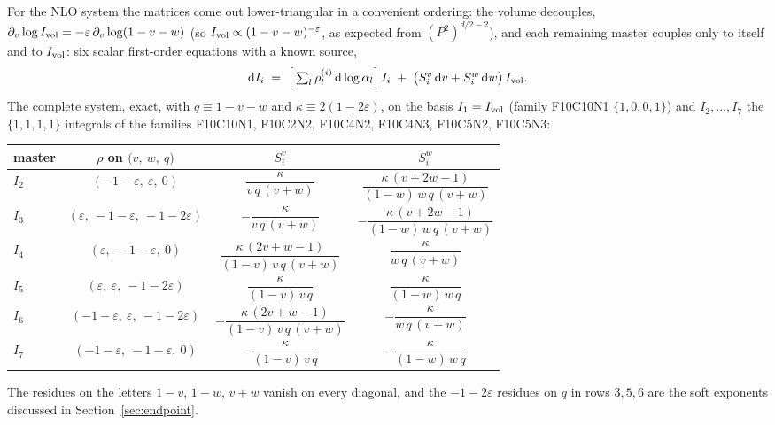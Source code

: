 \documentclass[11pt]{article}
\newcommand{\eps}{\varepsilon}
\newcommand{\dd}{\mathrm{d}}
\begin{document}
For the NLO system the matrices come out lower-triangular in a
convenient ordering: the volume decouples,
$\partial_v \log I_{\rm vol} = -\eps\,\partial_v\log(1-v-w)$
(so $I_{\rm vol} \propto (1-v-w)^{-\eps}$, as expected from
$(P^2)^{d/2-2}$), and each remaining master couples only to itself
and to $I_{\rm vol}$: six scalar first-order equations with a known
source,
\begin{equation}
  \dd I_i \;=\;
  \Big[\textstyle\sum_l \rho^{(i)}_l\, \dd\log \alpha_l\Big]\, I_i
  \;+\; \big(S^v_i\,\dd v + S^w_i\,\dd w\big)\, I_{\rm vol}.
  \label{eq:scalar}
\end{equation}
The complete system, exact, with $q \equiv 1-v-w$ and
$\kappa \equiv 2(1-2\eps)$, on the basis $I_1 = I_{\rm vol}$
(family F10C10N1 $\{1,0,0,1\}$) and
$I_2,\dots,I_7$ the $\{1,1,1,1\}$ integrals of the families
F10C10N1, F10C2N2, F10C4N2, F10C4N3, F10C5N2, F10C5N3:
\begin{center}
\small
\renewcommand{\arraystretch}{1.4}
\begin{tabular}{lccc}
\toprule
master & $\rho$ on $\big(v,\ w,\ q\big)$ &
$S^v_i$ & $S^w_i$ \\
\midrule
$I_2$ & $(-1{-}\eps,\ \eps,\ 0)$ &
$\dfrac{\kappa}{v\,q\,(v{+}w)}$ &
$\dfrac{\kappa\,(v{+}2w{-}1)}{(1{-}w)\,w\,q\,(v{+}w)}$ \\
$I_3$ & $(\eps,\ -1{-}\eps,\ -1{-}2\eps)$ &
$-\dfrac{\kappa}{v\,q\,(v{+}w)}$ &
$-\dfrac{\kappa\,(v{+}2w{-}1)}{(1{-}w)\,w\,q\,(v{+}w)}$ \\
$I_4$ & $(\eps,\ -1{-}\eps,\ 0)$ &
$\dfrac{\kappa\,(2v{+}w{-}1)}{(1{-}v)\,v\,q\,(v{+}w)}$ &
$\dfrac{\kappa}{w\,q\,(v{+}w)}$ \\
$I_5$ & $(\eps,\ \eps,\ -1{-}2\eps)$ &
$\dfrac{\kappa}{(1{-}v)\,v\,q}$ &
$\dfrac{\kappa}{(1{-}w)\,w\,q}$ \\
$I_6$ & $(-1{-}\eps,\ \eps,\ -1{-}2\eps)$ &
$-\dfrac{\kappa\,(2v{+}w{-}1)}{(1{-}v)\,v\,q\,(v{+}w)}$ &
$-\dfrac{\kappa}{w\,q\,(v{+}w)}$ \\
$I_7$ & $(-1{-}\eps,\ -1{-}\eps,\ 0)$ &
$-\dfrac{\kappa}{(1{-}v)\,v\,q}$ &
$-\dfrac{\kappa}{(1{-}w)\,w\,q}$ \\
\bottomrule
\end{tabular}
\end{center}
The residues on the letters $1{-}v$, $1{-}w$, $v{+}w$ vanish on every
diagonal, and the $-1-2\eps$ residues on $q$ in rows $3,5,6$ are the
soft exponents discussed in Section~\ref{sec:endpoint}.
\end{document}
